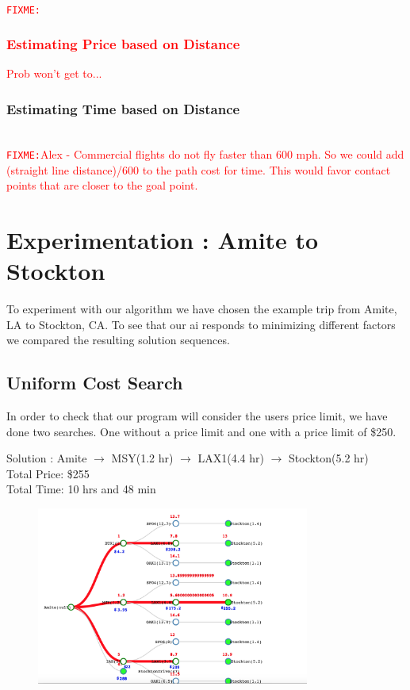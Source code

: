 \documentclass[11pt]{article}
\newcommand{\FIXME}[1]{ \ \\ \hspace* {-1.5 cm}
  \textcolor{red}{\texttt{FIXME:}#1} \medskip\par}
\begin{document}
\FIXME{\subsubsection{Estimating Price based on Distance} Prob won't get to...}

\subsubsection{Estimating Time based on Distance}



\FIXME{Alex - Commercial flights do not fly faster than 600 mph. So we could add (straight line distance)/600 to the path cost for time. This would favor contact points that are closer to the goal point.}

\section{Experimentation : Amite to Stockton}

To experiment with our algorithm we have chosen the example trip from Amite, LA to Stockton, CA. To see that our ai responds to minimizing different factors we compared the resulting solution sequences. 

\subsection{Uniform Cost Search}

In order to check that our program will consider the users price limit, we have done two searches. One without a price limit and one with a price limit of \$250.
\begin{center}
Solution : Amite $\rightarrow$ MSY(1.2 hr) $\rightarrow$ LAX1(4.4 hr) $\rightarrow$ Stockton(5.2 hr) \\
\quad Total Price: \$255 \\
\quad Total Time: 10 hrs and 48 min
\end{center}

\begin{figure}[!ht]
  \centering
  \includegraphics[width=0.8\textwidth]{time}
  \label{fig:time}
\end{figure}
\end{document}
